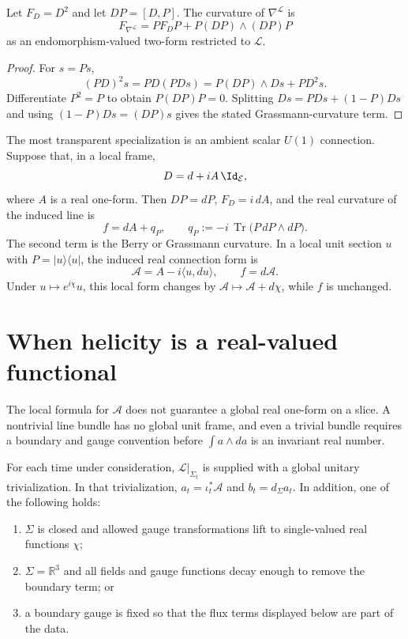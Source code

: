 \documentclass[11pt]{article}
\DeclareMathOperator{\Tr}{Tr}
\newcommand{\cE}{\mathcal E}
\newcommand{\cL}{\mathcal L}
\begin{document}
\begin{theorem}
\label{thm:projected-curvature}
Let \(F_D=D^2\) and let \(DP=[D,P]\).  The curvature of
\(\nabla^\cL\) is
\[
F_{\nabla^\cL}
 =P F_D P+P(DP)\wedge(DP)P
\]
as an endomorphism-valued two-form restricted to \(\cL\).
\end{theorem}

\begin{proof}
For \(s=Ps\),
\[
(P D)^2s=P D(PDs)
       =P(DP)\wedge Ds+P D^2s.
\]
Differentiate \(P^2=P\) to obtain \(P(DP)P=0\).  Splitting
\(Ds=P Ds+(1-P)Ds\) and using
\((1-P)Ds=(DP)s\) gives the stated Grassmann-curvature term.
\end{proof}

The most transparent specialization is an ambient scalar \(U(1)\) connection.
Suppose that, in a local frame,
\[
D=d+iA\,\Id_{\cE},
\]
where \(A\) is a real one-form.  Then \(DP=dP\), \(F_D=i\,dA\), and the
real curvature of the induced line is
\begin{equation}
f=dA+q_P,
\qquad
q_P:=-i\,\Tr\!\bigl(P\,dP\wedge dP\bigr).
\label{eq:curvature-split}
\end{equation}
The second term is the Berry or Grassmann curvature.  In a local unit section
\(u\) with \(P=|u\rangle\langle u|\), the induced real connection form is
\[
\mathcal A=A-i\langle u,du\rangle,
\qquad
f=d\mathcal A.
\]
Under \(u\mapsto e^{i\chi}u\), this local form changes by
\(\mathcal A\mapsto\mathcal A+d\chi\), while \(f\) is unchanged.

\section{When helicity is a real-valued functional}
\label{sec:helicity-domain}

The local formula for \(\mathcal A\) does not guarantee a global real one-form
on a slice.  A nontrivial line bundle has no global unit frame, and even a
trivial bundle requires a boundary and gauge convention before
\(\int a\wedge da\) is an invariant real number.

\begin{assumption}\label{ass:absolute-domain}
For each time under consideration, \(\cL|_{\Sigma_t}\) is supplied with a
global unitary trivialization.  In that trivialization,
\(a_t=\iota_t^*\mathcal A\) and \(b_t=d_\Sigma a_t\).  In addition, one of the
following holds:
\begin{enumerate}[label=(\alph*)]
\item \(\Sigma\) is closed and allowed gauge transformations lift to
single-valued real functions \(\chi\);
\item \(\Sigma=\mathbb R^3\) and all fields and gauge functions decay enough
to remove the boundary term; or
\item a boundary gauge is fixed so that the flux terms displayed below are
part of the data.
\end{enumerate}
\end{assumption}
\end{document}
